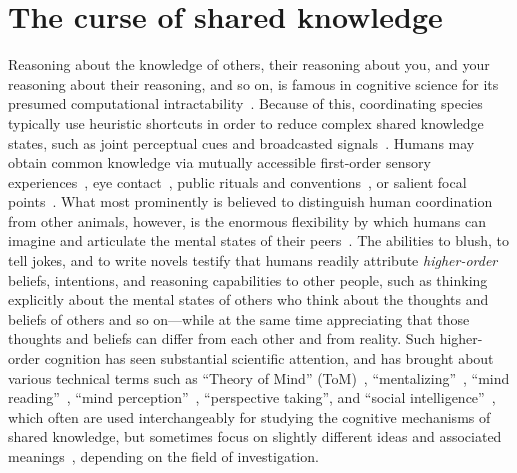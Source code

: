 \section{The curse of shared knowledge}
Reasoning about the knowledge of others, their reasoning about you, and your reasoning about their reasoning, and so on, is famous in cognitive science for its presumed computational intractability~\cite{van2018parameterized,bolander2023parameterized}. Because of this, coordinating species typically use heuristic shortcuts in order to reduce complex shared knowledge states, such as joint perceptual cues and broadcasted signals~\cite{milgrom1981axiomatic, clark1996using, bradbury1998principles}. Humans may obtain common knowledge via mutually accessible first-order sensory experiences~\cite{tomasello1995joint, lorini2005establishing, bolander2015announcements, gintis2010rationality}, eye contact~\cite{friedell1969structure}, public rituals and conventions~\cite{lewis1969convention}, or salient focal points~\cite{schelling1957bargaining}. What most prominently is believed to distinguish human coordination from other animals, however, is the enormous flexibility by which humans can imagine and articulate the mental states of their peers~\cite{tooby2010groups, harari2014sapiens}. The abilities to blush, to tell jokes, and to write novels testify that humans readily attribute \textit{higher-order} beliefs, intentions, and reasoning capabilities to other people, such as thinking explicitly about the mental states of others who think about the thoughts and beliefs of others and so on---while at the same time appreciating that those thoughts and beliefs can differ from each other and from reality. Such higher-order cognition has seen substantial scientific attention, and has brought about various technical terms such as ``Theory of Mind'' (ToM)~\cite{premack1978does}, ``mentalizing''~\cite{frith2003development}, ``mind reading''~\cite{vogeley2001mind, apperly2010mindreaders}, %
``mind perception''~\cite{gray2011distortions}, ``perspective taking'', and ``social intelligence''~\cite{baron1999social}, which often are used interchangeably for studying the cognitive mechanisms of shared knowledge, but sometimes focus on slightly different ideas and associated meanings~\cite{schaafsma2015deconstructing}, depending on the field of investigation.

